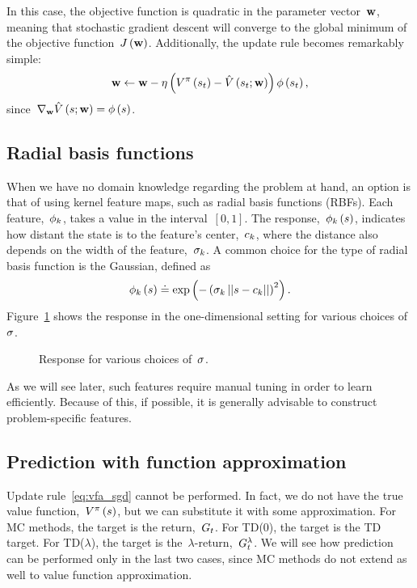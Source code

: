 In this case, the objective function is quadratic in the parameter vector~${\mathbf{w}}$, meaning that stochastic gradient descent will converge to the global minimum of the objective function~${J\left(\mathbf{w}\right)}$. Additionally, the update rule becomes remarkably simple:
\begin{equation} \label{eq:vfa_sgd}
	\mathbf{w}\gets\mathbf{w}-\eta\left(V^{\pi}\left(s_{t}\right)-\hat{V}\left(s_{t};\mathbf{w}\right)\right)\phi\left(s_{t}\right),
\end{equation}
since~${\nabla_{\valueparameter}\approximatestatevalue\left(\state;\valueparameter\right)=\featurevector\left(\state\right)}$.

\subsection{Radial basis functions}
When we have no domain knowledge regarding the problem at hand, an option is that of using kernel feature maps, such as radial basis functions (RBFs). Each feature,~${\phi_{k}}$, takes a value in the interval~${\left[0,1\right]}$. The response,~${\featurevectorcomponent_{\indexletter}\left(\state\right)}$, indicates how distant the state is to the feature's center,~${c_{k}}$, where the distance also depends on the width of the feature,~${\sigma_{k}}$. A common choice for the type of radial basis function is the Gaussian, defined as
\begin{equation}
	\featurevectorcomponent_{\indexletter}\left(\state\right)\doteq\exp\left(-\left(\rbfwidth_{\indexletter}\left\lvert\left\lvert\state-\rbfcenter_{\indexletter}\right\rvert\right\rvert\right)^{2}\right).
\end{equation}
Figure~\ref{fig:rbf_by_width} shows the response in the one-dimensional setting for various choices of~${\sigma}$.
\begin{figure}
\centering

\caption{Response for various choices of~${\sigma}$.}
\label{fig:rbf_by_width}
\end{figure}
As we will see later, such features require manual tuning in order to learn efficiently. Because of this, if possible, it is generally advisable to construct problem-specific features.

\subsection{Prediction with function approximation}
Update rule~\eqref{eq:vfa_sgd} cannot be performed. In fact, we do not have the true value function,~${\statevalue\policyscript\left(\state\right)}$, but we can substitute it with some approximation. For MC methods, the target is the return,~${G_{t}}$. For TD(0), the target is the TD target. For TD(${\lambda}$), the target is the~${\lambda}$-return,~${G_{t}^{\lambda}}$. We will see how prediction can be performed only in the last two cases, since MC methods do not extend as well to value function approximation.

